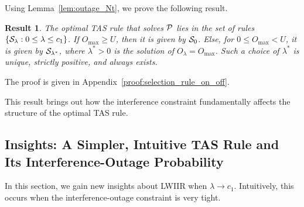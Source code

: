\documentclass[12pt,draftcls,peerreview,onecolumn]{IEEEtran}
\newtheorem{result}{{\bf Result}}
\newcommand{\brac}[1]{\left({#1}\right)}
\newcommand{\set}[1]{\{#1\}}
\newcommand{\tendsto}{\to}
\newcommand{\ie}{{i.e.}}
\newcommand{\prob}[1]{\text{Pr}\brac{#1}}
\newcommand{\lam}{\lambda}
\newcommand{\lamstar}{\lam^{*}}
\newcommand{\Nt}{{N_t}}
\newcommand{\Pt}{{P_t}}
\newcommand{\puch}{g}
\newcommand{\gk}[1]{{\puch_{#1}}}
\newcommand{\g}{\mathbf{\puch}}
\newcommand{\outmax}{O_{\text{max}}}
\newcommand{\itau}{\tau}
\newcommand{\cone}{c_{1}}
\newcommand{\out}{O}
\newcommand{\taubypt}{\frac{\itau}{\Pt}}
\newcommand{\gkgrtaubypt}[1]{{\gk{#1}}>\taubypt}
\newcommand{\un}{U}
\newcommand{\optproblem}{{\cal P}}
\newcommand{\caluncons}{{\cal S_{\text{0}}}}
\newcommand{\callamrule}{{\cal S_{{\lam}}}}
\newcommand{\outlam}{\out_{\lam}}
\newcommand{\callamstarrule}{\cal S_{\lam^{*}}}
\begin{document}
Using Lemma~\ref{lem:outage_Nt}, we prove the following result. 
%
\begin{result}
\label{res:selection_rule_on_off}
The optimal TAS rule that solves $\optproblem$ lies in the set of rules $\set{\callamrule:0\leq\lam\leq\cone}$. If $\outmax\geq\un$, then it is given by $\caluncons$. Else, for $0\leq\outmax<\un$, it is given by $\callamstarrule$, where $\lamstar>0$  is the solution of $\outlam=\outmax$. Such a choice of $\lamstar$ is unique, strictly positive, and always exists. 
\end{result}
%                
\begin{IEEEproof}
   The proof is given in Appendix~\ref{proof:selection_rule_on_off}.
\end{IEEEproof}
%

This result brings out how the interference constraint fundamentally affects the structure of the optimal TAS rule.


\subsection{Insights: A Simpler, Intuitive  TAS Rule and Its Interference-Outage Probability}
In this section, we gain new insights about LWIIR when $\lam \tendsto \cone$. Intuitively, this occurs when the interference-outage constraint is very tight. %
\end{document}
